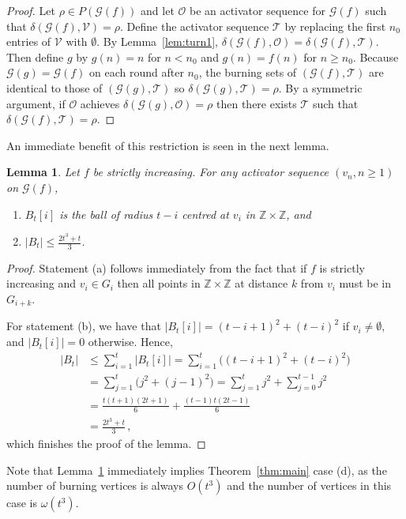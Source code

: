 \documentclass[12pt]{article}
\newtheorem{lemma}[theorem]{Lemma}
\theoremstyle{remark}
\providecommand{\Z}{}
\renewcommand{\Z}{\mathbb{Z}}
\newcommand\cG{\mathcal G}
\newcommand\cO{\mathcal O}
\newcommand\cT{{\mathcal T}}
\newcommand\cV{\mathcal V}
\begin{document}
\begin{proof}
Let $\rho \in P(\cG(f))$ and let $\cO$ be an activator sequence for $\cG(f)$ such that $\delta(\cG(f),\cV) = \rho$. Define the activator sequence $\cT$ by replacing the first $n_0$ entries of $\cV$ with $\emptyset$. By Lemma~\ref{lem:turn1}, $\delta(\cG(f), \cO) = \delta(\cG(f), \cT)$. Then define $g$ by $g(n) = n$ for $n < n_0$ and $g(n) = f(n)$ for $n \geq n_0$. Because $\cG(g) = \cG(f)$ on each round after $n_0$, the burning sets of $(\cG(f), \cT)$ are identical to those of $(\cG(g), \cT)$ so $\delta(\cG(g), \cT) = \rho$. By a symmetric argument, if $\cO$ achieves $\delta(\cG(g),\cO) = \rho$ then there exists $\cT$ such that $\delta(\cG(f),\cT) = \rho$.
\end{proof}

An immediate benefit of this restriction is seen in the next lemma.

\begin{lemma}\label{lem:burnt bound}
Let $f$ be strictly increasing. For any activator sequence $(v_n, n\geq 1)$ on $\cG(f)$,
\begin{enumerate}
\item[(a)] $B_t[i]$ is the ball of radius $t-i$ centred at $v_i$ in $\Z \times \Z$, and
\item[(b)] $|B_t| \leq \frac{2t^3+t}{3}$.
\end{enumerate}
\end{lemma}

\begin{proof}
Statement (a) follows immediately from the fact that if $f$ is strictly increasing and $v_i \in G_i$ then all points in $\Z \times \Z$ at distance $k$ from $v_i$ must be in $G_{i+k}$.

For statement (b), we have that $|B_t[i]| = (t-i+1)^2 + (t-i)^2$ if $v_i \neq \emptyset$, and $|B_t[i]| = 0$ otherwise. Hence, 
\begin{align*}
|B_t| 
&\leq
\sum_{i=1}^t |B_t[i]|
=
\sum_{i=1}^t \Big( (t-i+1)^2 + (t-i)^2 \Big)\\
&=
\sum_{j=1}^t \Big( j^2 + (j-1)^2 \Big)
= \sum_{j=1}^t j^2 + \sum_{j=0}^{t-1} j^2 \\
&=
\frac{t(t+1)(2t+1)}{6} + \frac{(t-1)t(2t-1)}{6}\\
&=
\frac{2t^3 + t}{3} \,,
\end{align*}
which finishes the proof of the lemma.
\end{proof}

Note that Lemma~\ref{lem:burnt bound} immediately implies Theorem~\ref{thm:main} case (d), as the number of burning vertices is always $O(t^3)$ and the number of vertices in this case is $\omega(t^3)$. 
\end{document}

